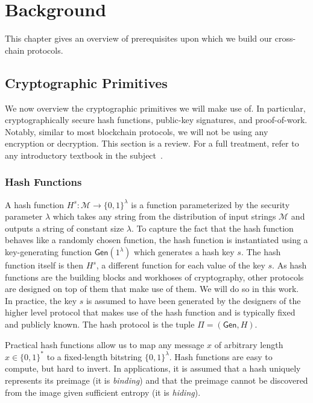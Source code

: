 \chapter{Background}\label{chapter:background}

This chapter gives an overview of prerequisites upon which we build our
cross-chain protocols.



\section{Cryptographic Primitives}

We now overview the cryptographic primitives we will make use of. In particular,
cryptographically secure hash functions, public-key signatures, and
proof-of-work. Notably, similar to most blockchain protocols, we will not be
using any encryption or decryption. This section is a review. For a full
treatment, refer to any introductory textbook in the subject~\cite{katz,handbook,foundations1,foundations2}.

\subsection{Hash Functions}
A hash function $H^s: \mathcal{M} \longrightarrow \{0, 1\}^\lambda$ is a function
parameterized by the security parameter $\lambda$ which takes any string from the distribution of input strings $\mathcal{M}$ and
outputs a string of constant size $\lambda$. To capture the fact that the hash
function behaves like a randomly chosen function, the hash
function is instantiated using a key-generating function
$\textsf{Gen}(1^\lambda)$ which generates a hash key $s$. The hash function itself is then $H^s$, a different function for each value of the key $s$. As hash functions are the building blocks and workhoses of cryptography, other protocols are designed on top of them that make use of them. We will do so in this work. In practice, the key $s$ is assumed to have been generated by the designers of the higher level protocol that makes use of the hash function and is typically fixed and publicly known. The hash protocol is the tuple $\Pi = (\textsf{Gen}, H)$.

Practical hash functions allow us to map any message $x$ of arbitrary length
$x \in \{0, 1\}^*$ to a fixed-length bitstring $\{0, 1\}^\lambda$. Hash
functions are easy to compute, but hard to invert. In applications, it is
assumed that a hash uniquely represents its preimage (it is \emph{binding}) and
that the preimage cannot be discovered from the image given sufficient entropy
(it is \emph{hiding}).

